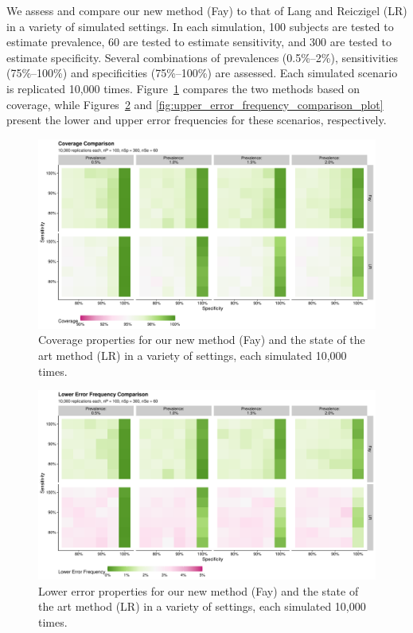 \documentclass[AMA,STIX1COL]{WileyNJD-v2}
\begin{document}
We assess and compare our new method (Fay) to that of Lang and Reiczigel (LR) in a variety of simulated settings.
In each simulation, 100 subjects are tested to estimate prevalence, 60 are tested to estimate sensitivity, and 300 are tested to estimate specificity.
Several combinations of prevalences (0.5\%--2\%), sensitivities (75\%--100\%) and specificities (75\%--100\%) are assessed.
Each simulated scenario is replicated 10,000 times.
Figure~\ref{fig:coverage_comparison_plot} compares the two methods based on coverage, while Figures~\ref{fig:lower_error_frequency_comparison_plot} and \ref{fig:upper_error_frequency_comparison_plot} present the lower and upper error frequencies for these scenarios, respectively.

\begin{figure}
    \centering
    \includegraphics[width=\textwidth]{figures/coverage_comparison_plot}
    \caption{Coverage properties for our new method (Fay) and the state of the art method (LR) in a variety of settings, each simulated 10,000 times.}
    \label{fig:coverage_comparison_plot}
\end{figure}

\begin{figure}
    \centering
    \includegraphics[width=\textwidth]{figures/lower_error_frequency_comparison_plot}
    \caption{Lower error properties for our new method (Fay) and the state of the art method (LR) in a variety of settings, each simulated 10,000 times.}
    \label{fig:lower_error_frequency_comparison_plot}
\end{figure}
\end{document}
